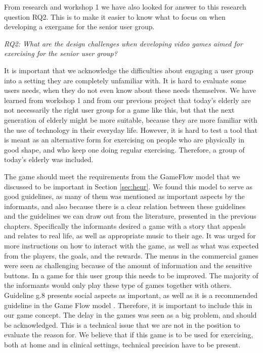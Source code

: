 From research and workshop 1 we have also looked for answer to this research question RQ2. This is to make it easier to know what to focus on when developing a exergame for the senior user group.

\emph{RQ2: What are the design challenges when developing video games aimed for exercising for the senior user group?}

It is important that we acknowledge the difficulties about engaging a user group into a setting they are completely unfamiliar with. It is hard to evaluate some users needs, when they do not even know about these needs themselves. We have learned from workshop 1 and from our previous project \cite{project} that today's elderly are not necessarily the right user group for a game like this, but that the next generation of elderly might be more suitable, because they are more familiar with the use of technology in their everyday life. However, it is hard to test a tool that is meant as an alternative form for exercising on people who are physically in good shape, and who keep one doing regular exercising. Therefore, a group of today's elderly was included.

The game should meet the requirements from the GameFlow model \cite{sweetser} that we discussed to be important in Section \ref{sec:heur}. We found this model to serve as good guidelines, as many of them was mentioned as important aspects by the informants, and also because there is a clear relation between these guidelines and the guidelines we can draw out from the literature, presented in the previous chapters. Specifically the informants desired a game with a story that appeals and relates to real life, as well as appropriate music to their age. It was urged for more instructions on how to interact with the game, as well as what was expected from the players, the goals, and the rewards. The menus in the commercial games were seen as challenging because of the amount of information and the sensitive buttons. In a game for this user group this needs to be improved. The majority of the informants would only play these type of games together with others. Guideline g.8 presents social aspects as important, as well as it is a recommended guideline in the Game Flow model \cite{sweetser}. Therefore, it is important to include this in our game concept. The delay in the games was seen as a big problem, and should be acknowledged.  This is a technical issue that we are not in the position to evaluate the reason for. We believe that if this game is to be used for exercising, both at home and in clinical settings, technical precision have to be present. 

